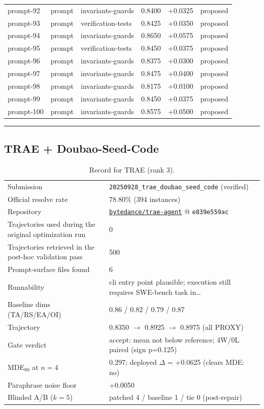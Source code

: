 \begin{center}
\begin{longtable}{llp{5.2cm}rrl}
prompt-92 & prompt & invariants-guards & 0.8400 & +0.0325 & proposed \\
prompt-93 & prompt & verification-tests & 0.8425 & +0.0350 & proposed \\
prompt-94 & prompt & invariants-guards & 0.8650 & +0.0575 & proposed \\
prompt-95 & prompt & verification-tests & 0.8450 & +0.0375 & proposed \\
prompt-96 & prompt & invariants-guards & 0.8375 & +0.0300 & proposed \\
prompt-97 & prompt & invariants-guards & 0.8475 & +0.0400 & proposed \\
prompt-98 & prompt & invariants-guards & 0.8175 & +0.0100 & proposed \\
prompt-99 & prompt & invariants-guards & 0.8450 & +0.0375 & proposed \\
prompt-100 & prompt & invariants-guards & 0.8575 & +0.0500 & proposed \\
\bottomrule\end{longtable}\end{center}
\par\bigskip\hrule\bigskip
\subsection{TRAE + Doubao-Seed-Code}
\label{app:agent3}
\begin{table}[H]\centering\scriptsize
\caption{Record for TRAE (rank 3).}
\begin{tabular}{lp{8.2cm}}\toprule
Submission & \texttt{20250928\_\allowbreak{}trae\_\allowbreak{}doubao\_\allowbreak{}seed\_\allowbreak{}code} (verified) \\
Official resolve rate & 78.80\% (394 instances) \\
Repository & \href{https://github.com/bytedance/trae-agent}{\texttt{bytedance/trae-agent}} @ \texttt{e839e559ac} \\
Trajectories used during the original optimization run & 0 \\
Trajectories retrieved in the post-hoc validation pass & 500 \\
Prompt-surface files found & 6 \\
Runnability & cli entry point plausible; execution still requires SWE-bench task in\ldots{} \\
Baseline dims (TA/RS/EA/OI) & 0.86 / 0.82 / 0.79 / 0.87 \\
Trajectory & 0.8350 $\to$ 0.8925 $\to$ 0.8975 (all PROXY) \\
Gate verdict & accept: mean not below reference; 4W/0L paired (sign p=0.125) \\
MDE$_{80}$ at $n{=}4$ & 0.297; deployed $\Delta$ = +0.0625 (clears MDE: no) \\
Paraphrase noise floor & +0.0050 \\
Blinded A/B ($k{=}5$) & patched 4 / baseline 1 / tie 0 (post-repair) \\
\bottomrule\end{tabular}\end{table}
